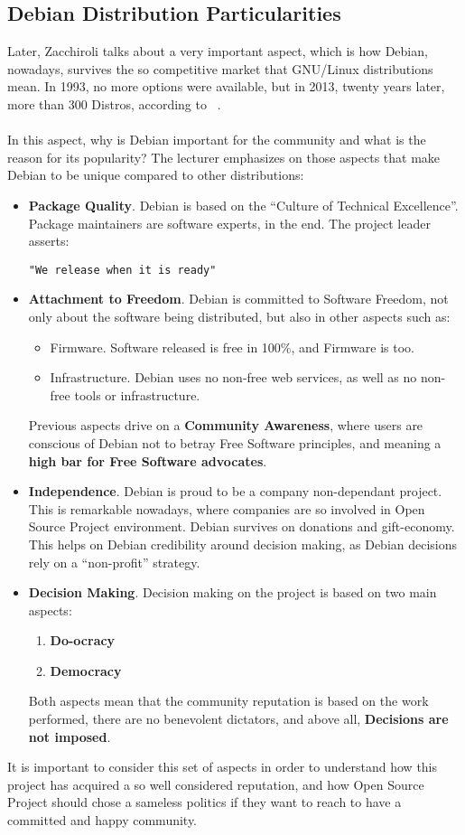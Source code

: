 \documentclass[11pt]{article}
\begin{document}
\subsection{Debian Distribution Particularities}
Later, Zacchiroli talks about a very important aspect, which is how Debian, nowadays, survives the so competitive market that GNU/Linux distributions mean. In 1993, no more options were available, but in 2013, twenty years later, more than 300 Distros, according to ~\cite{DISTW00}.\\
\\
In this aspect, why is Debian important for the community and what is the reason for its popularity? The lecturer emphasizes on those aspects that make Debian to be unique compared to other distributions:
\begin{itemize}
\item{\textbf{Package Quality}}. Debian is based on the ``Culture of Technical Excellence''. Package maintainers are software experts, in the end. The project leader asserts:
\begin{verbatim}
"We release when it is ready"
\end{verbatim}
\item{\textbf{Attachment to Freedom}}. Debian is committed to Software Freedom, not only about the software being distributed, but also in other aspects such as:
\begin{itemize}\itemsep0pt
\item{Firmware}. Software released is free in 100\%, and Firmware is too.
\item{Infrastructure}. Debian uses no non-free web services, as well as no non-free tools or infrastructure.
\end{itemize}
Previous aspects drive on a \textbf{Community Awareness}, where users are conscious of Debian not to betray Free Software principles, and meaning a \textbf{high bar for Free Software advocates}.
\item{\textbf{Independence}}. Debian is proud to be a company non-dependant project. This is remarkable nowadays, where companies are so involved in Open Source Project environment. Debian survives on donations and gift-economy. This helps on Debian credibility around decision making, as Debian decisions rely on a ``non-profit'' strategy.
\item{\textbf{Decision Making}}. Decision making on the project is based on two main aspects:
\begin{enumerate}\itemsep0pt
\item{\textbf{Do-ocracy}}
\item{\textbf{Democracy}}
\end{enumerate}
Both aspects mean that the community reputation is based on the work performed, there are no benevolent dictators, and above all, \textbf{Decisions are not imposed}.
\end{itemize}
It is important to consider this set of aspects in order to understand how this project has acquired a so well considered reputation, and how Open Source Project should chose a sameless politics if they want to reach to have a committed and happy community.
\end{document}
